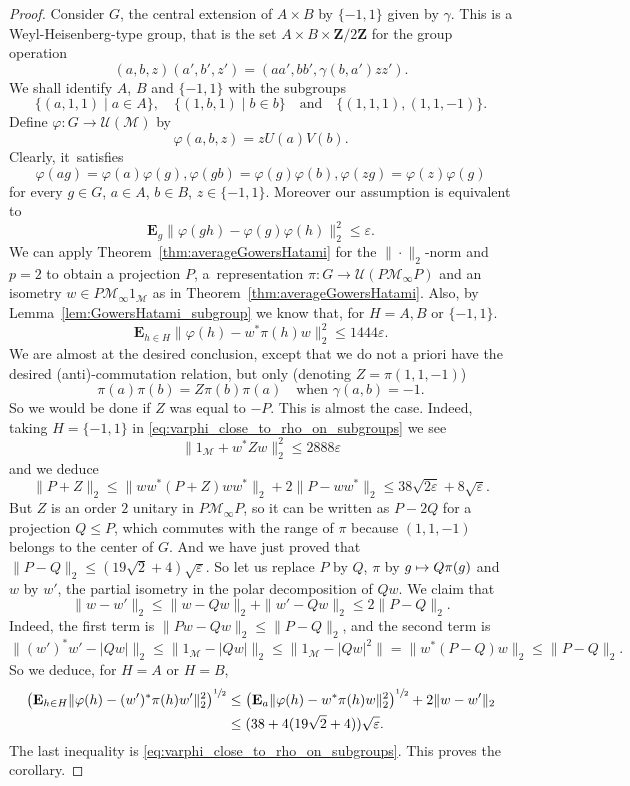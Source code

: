 \documentclass[JEP,XML,SOM,Unicode,published]{cedram}
\newcommand\mto{\mathchoice{\longmapsto}{\mapsto}{\mapsto}{\mapsto}}
\theoremstyle{plain}
\theoremstyle{definition}
\newcommand{\Z}{\mathbf{Z}}
\newcommand{\cM}{\mathcal{M}}
\newcommand{\E}{\mathbf{E}}
\newcommand{\cU}{\mathcal{U}}
\begin{document}
\begin{proof} Consider $G$, the central extension of $A\times B$ by $\{-1,1\}$ given by $\gamma$. This is a Weyl-Heisenberg-type group, that is the set $A\times B \times \Z/2\Z$ for the group operation
\[
(a,b,z)(a',b',z') = (aa',bb',\gamma(b,a')zz').
\]
We shall identify $A$, $B$ and $\{-1,1\}$ with the subgroups
\[
\{(a,1,1)\mid a \in A\},\quad \{(1,b,1)\mid b \in b\}\quad\text{and}\quad\{(1,1,1),(1,1,-1)\}.
\]
Define $\varphi:G \to \cU(\cM)$ by
\[
\varphi(a,b,z) = z U(a) V(b).
\] Clearly, it~satisfies
\[
\varphi(a g) = \varphi(a) \varphi(g), \varphi(gb) = \varphi(g) \varphi(b), \varphi(zg) = \varphi(z) \varphi(g)
\]
for every $g \in G$, $a \in A$, $b \in B$, $z \in \{-1,1\}$. Moreover our assumption is equivalent to
\[
\E_g \|\varphi(gh) - \varphi(g) \varphi(h)\|_2^2 \leq \varepsilon.
\]
We can apply Theorem~\ref{thm:averageGowersHatami} for the $\|{\cdot}\|_2$-norm and $p=2$ to obtain a projection $P$, a~representation $\pi:G \to \cU(P\cM_\infty P)$ and an isometry $w \in P \cM_\infty 1_\cM$ as in Theorem~\ref{thm:averageGowersHatami}. Also, by Lemma~\ref{lem:GowersHatami_subgroup} we know that, for $H=A,B$ or $\{-1,1\}$.
\begin{equation}\label{eq:varphi_close_to_rho_on_subgroups} \E_{h\in H} \|\varphi(h) - w^* \pi(h) w\|_2^2 \leq 1444 \varepsilon.
\end{equation}
We are almost at the desired conclusion, except that we do not a priori have the desired (anti)-commutation relation, but only (denoting $Z = \pi(1,1,-1)$)
\[
\pi(a) \pi (b) = Z \pi(b) \pi(a)\quad\text{when }\gamma(a,b)=-1.
\]
So we would be done if $Z$ was equal to $-P$. This is almost the case. Indeed, taking $H = \{-1,1\}$ in \eqref{eq:varphi_close_to_rho_on_subgroups} we see
\[
\|1_\cM + w^* Z w\|_2^2 \leq 2888\varepsilon
\]
and we deduce
\[
\| P + Z\|_2 \leq \|ww^* (P+Z)ww^*\|_2 + 2\|P-ww^*\|_2 \leq 38\sqrt{2\varepsilon}+8\sqrt{\varepsilon}.
\]
But $Z$ is an order $2$ unitary in $P \cM_\infty P$, so it can be written as $P-2Q$ for a projection $Q \leq P$, which commutes with the range of $\pi$ because $(1,1,-1)$ belongs to the center of $G$. And we have just proved that $\|P-Q\|_2 \leq (19\sqrt{2}+4)\sqrt \varepsilon$. So let us replace $P$ by $Q$, $\pi$ by $g \mto Q \pi(g)$ and $w$ by $w'$, the partial isometry in the polar decomposition of $Qw$. We claim that
\[
\|w-w'\|_2 \leq \|w - Qw\|_2 + \|w'-Qw\|_2\leq 2 \|P-Q\|_2.
\]
Indeed, the first term is $\|Pw-Qw\|_2 \leq \|P-Q\|_2$, and the second term is
\[
\|(w')^*w' - |Qw|\|_2 \leq \|1_\cM - |Qw|\|_2 \leq \|1_\cM -|Qw|^2\| = \|w^*(P-Q)w\|_2 \leq \|P-Q\|_2.
\]
So we deduce, for $H=A$ or $H=B$,
\begin{align*} \left(\E_{h \in H} \|\varphi(h) - (w')^* \pi(h) w'\|_2^2\right)^{\sfrac 1 2} &\leq \left(\E_a \|\varphi(h) - w^* \pi(h) w\|_2^2\right)^{\sfrac 1 2} + 2\|w-w'\|_2\\
& \leq (38+4(19\sqrt{2}+4))\sqrt{\varepsilon}.
\end{align*}
The last inequality is \eqref{eq:varphi_close_to_rho_on_subgroups}. This proves the corollary.
\end{proof}
\end{document}
